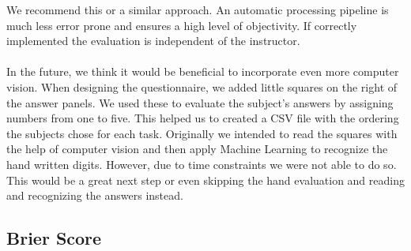 \documentclass[../main/main.tex]{subfiles}
\begin{document}
	We recommend this or a similar approach. An automatic processing pipeline is much less error prone and ensures a high level of objectivity. If correctly implemented the evaluation is independent of the instructor. 
	\\\\
	In the future, we think it would be beneficial to incorporate even more computer vision. When designing the questionnaire, we added little squares on the right of the answer panels. We used these to evaluate the subject's answers by assigning numbers from one to five. This helped us to created a CSV file with the ordering the subjects chose for each task. Originally we intended to read the squares with the help of computer vision and then apply Machine Learning to recognize the hand written digits. However, due to time constraints we were not able to do so. This would be a great next step or even skipping the hand evaluation and reading and recognizing the answers instead.
	
	\subsection{Brier Score}
	
	
\end{document}
